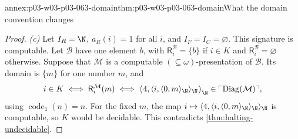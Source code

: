 \begin{annexitem}{annex:p03-w03-p03-063-domain}{thm:p03-w03-p03-063-domain}{What the domain convention changes}
\begin{proof}
\emph{(c)}  Let \(I_R=\N\), \(a_R(i)=1\) for all \(i\), and
\(I_F=I_C=\varnothing\).  This signature is computable.  Let
\(\mathcal B\) have one element \(b\), with \(\mathsf R_i^{\mathcal B}=\{b\}\)
if \(i\in K\) and \(\mathsf R_i^{\mathcal B}=\varnothing\) otherwise.
Suppose that \(\mathcal M\) is a computable \((\subseteq\omega)\)-presentation
of \(\mathcal B\).  Its domain is \(\{m\}\) for one number \(m\), and
\[
 i\in K\iff \mathsf R_i^{\mathcal M}(m)\iff
 \bigl\langle4,\langle i,\langle0,m\rangle_{\N}\rangle_{\N}\bigr\rangle_{\N}
 \in\ulcorner\operatorname{Diag}(\mathcal M)\urcorner,
\]
using \(\operatorname{code}_1(n)=n\).  For the fixed \(m\), the map
\(i\mapsto\langle4,\langle i,\langle0,m\rangle_{\N}\rangle_{\N}\rangle_{\N}\)
is computable, so \(K\) would be decidable.  This contradicts
\cref{thm:halting-undecidable}.
\end{proof}
\end{annexitem}

